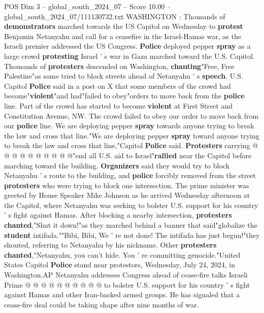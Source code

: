 \begin{textsample}{POS Dim 3 – global\_south\_2024\_07 – Score 10.00 – global\_south\_2024\_07/111130732.txt}  \label{ex:f3_pos_312}
WASHINGTON : Thousands of \textbf{demonstrators} marched towards the US Capitol on Wednesday to \textbf{protest} Benjamin Netanyahu and call for a ceasefire in the Israel-Hamas war, as the Israeli premier addressed the US Congress. \textbf{Police} deployed pepper \textbf{spray} as a large crowd \textbf{protesting} Israel ' s war in Gaza marched toward the U.S.
Capitol.
Thousands of \textbf{protesters} descended on Washington, \textbf{chanting}"Free, Free Palestine"as some tried to block streets ahead of Netanyahu ' s \textbf{speech}.
U.S.
Capitol \textbf{Police} said in a post on X that some members of the crowd had become"\textbf{violent}"and had"failed to obey"orders to move back from the \textbf{police} line.
Part of the crowd has started to become \textbf{violent} at First Street and Constitution Avenue, NW.
The crowd failed to obey our order to move back from our \textbf{police} line.
We are deploying pepper \textbf{spray} towards anyone trying to break the law and cross that line."We are deploying pepper \textbf{spray} toward anyone trying to break the law and cross that line,"Capitol \textbf{Police} said. \textbf{Protesters} carrying @ @ @ @ @ @ @ @ @ @"end all U.S. aid to Israel"\textbf{rallied} near the Capitol before marching toward the building. \textbf{Organizers} said they would try to block Netanyahu ' s route to the building, and \textbf{police} forcibly removed from the street \textbf{protesters} who were trying to block one intersection.
The prime minister was greeted by House Speaker Mike Johnson as he arrived Wednesday afternoon at the Capitol, where Netanyahu was seeking to bolster U.S. support for his country ' s fight against Hamas.
After blocking a nearby intersection, \textbf{protesters} \textbf{chanted},"Shut it down!"as they marched behind a banner that said"globalize the \textbf{student} intifada.""Bibi, Bibi, We ' re not done!
The intifada has just begun!"they shouted, referring to Netanyahu by his nickname.
Other \textbf{protesters} \textbf{chanted},"Netanyahu, you can't hide.
You ' re committing genocide."United States Capitol \textbf{Police} stand near protestors, Wednesday, July 24, 2024, in Washington.AP Netanyahu addresses Congress ahead of cease-fire talks Israeli Prime @ @ @ @ @ @ @ @ @ @ to bolster U.S. support for his country ' s fight against Hamas and other Iran-backed armed groups.
He has signaled that a cease-fire deal could be taking shape after nine months of war.

\end{textsample}

